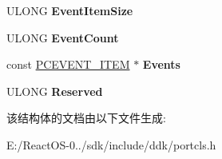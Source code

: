 \begin{DoxyCompactItemize}
U\+L\+O\+NG {\bfseries Event\+Item\+Size}
\item 
\mbox{\label{struct_p_c_a_u_t_o_m_a_t_i_o_n___t_a_b_l_e_ad7b6baf29f87bfb43000ff6e20b0293f}} 
U\+L\+O\+NG {\bfseries Event\+Count}
\item 
\mbox{\label{struct_p_c_a_u_t_o_m_a_t_i_o_n___t_a_b_l_e_a45e9adba411ff6117d79d9a9158cf810}} 
const \hyperlink{struct___p_c_e_v_e_n_t___i_t_e_m}{P\+C\+E\+V\+E\+N\+T\+\_\+\+I\+T\+EM} $\ast$ {\bfseries Events}
\item 
\mbox{\label{struct_p_c_a_u_t_o_m_a_t_i_o_n___t_a_b_l_e_a8c8d2d06164c96681f231cdb6708a3ef}} 
U\+L\+O\+NG {\bfseries Reserved}
\end{DoxyCompactItemize}


该结构体的文档由以下文件生成\+:\begin{DoxyCompactItemize}
\item 
E\+:/\+React\+O\+S-\/0../sdk/include/ddk/portcls.\+h\end{DoxyCompactItemize}
